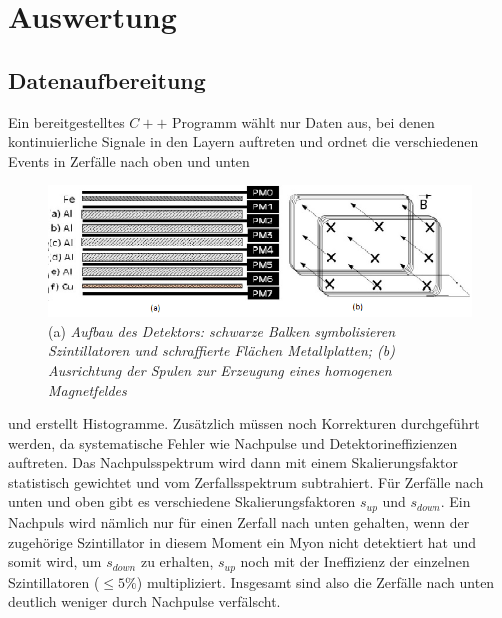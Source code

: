 \section{Auswertung}
\subsection{Datenaufbereitung}
Ein bereitgestelltes $C++$ Programm wählt nur Daten aus, bei denen kontinuierliche Signale in den Layern auftreten und ordnet die verschiedenen Events in Zerfälle nach oben und unten

\begin{figure}[h]
	\includegraphics[width=140mm]{Aufbau}
	\caption{(a) \itshape Aufbau des Detektors: schwarze Balken symbolisieren Szintillatoren und schraffierte Flächen Metallplatten; (b) Ausrichtung der Spulen zur Erzeugung eines homogenen Magnetfeldes}
	\label{fig:Abbildung 1}
\end{figure}


\noindent und erstellt Histogramme. Zusätzlich müssen noch Korrekturen durchgeführt werden, da systematische Fehler wie Nachpulse und Detektorineffizienzen auftreten. Das Nachpulsspektrum wird dann mit einem Skalierungsfaktor statistisch gewichtet und vom Zerfallsspektrum subtrahiert. Für Zerfälle nach unten und oben gibt es verschiedene Skalierungsfaktoren $s_{up}$ und $s_{down}$. Ein Nachpuls wird nämlich nur für einen Zerfall nach unten gehalten, wenn der zugehörige Szintillator in diesem Moment ein Myon nicht detektiert hat und somit wird, um $s_{down}$ zu erhalten, $s_{up}$ noch mit der Ineffizienz der einzelnen Szintillatoren ($\leq 5\% $) multipliziert. Insgesamt sind also die Zerfälle nach unten deutlich weniger durch Nachpulse verfälscht.
